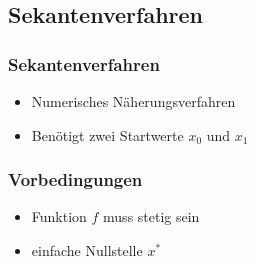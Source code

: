 \documentclass[table]{beamer}
\begin{document}
\subsection{Sekantenverfahren}
\begin{frame}
\frametitle{Sekantenverfahren}
\begin{itemize}
	\item Numerisches Näherungsverfahren
	\item Benötigt zwei Startwerte $x_0$ und $x_1$	
\end{itemize}
\end{frame}
\begin{frame}
\frametitle{Vorbedingungen}
\begin{itemize}
\item Funktion $f$ muss stetig sein
\item einfache Nullstelle $x^*$	
\end{itemize}
\end{frame}
\end{document}
